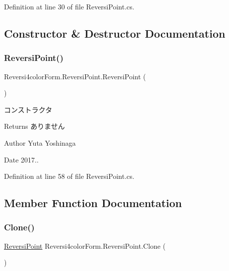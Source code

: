 Definition at line 30 of file Reversi\+Point.\+cs.



\subsection{Constructor \& Destructor Documentation}
\mbox{\label{class_reversi4color_form_1_1_reversi_point_a27174c0214cc9516f398f70a768d00fe}} 
\subsubsection{\texorpdfstring{Reversi\+Point()}{ReversiPoint()}}
{\footnotesize\ttfamily Reversi4color\+Form.\+Reversi\+Point.\+Reversi\+Point (\begin{DoxyParamCaption}{ }\end{DoxyParamCaption})}



コンストラクタ 

\begin{DoxyReturn}{Returns}
ありません 
\end{DoxyReturn}
\begin{DoxyAuthor}{Author}
Yuta Yoshinaga 
\end{DoxyAuthor}
\begin{DoxyDate}{Date}
2017.. 
\end{DoxyDate}


Definition at line 58 of file Reversi\+Point.\+cs.



\subsection{Member Function Documentation}
\mbox{\label{class_reversi4color_form_1_1_reversi_point_a2f9e4db4dd43e27f9c957e5a221ca6f2}} 
\subsubsection{\texorpdfstring{Clone()}{Clone()}}
{\footnotesize\ttfamily \hyperlink{class_reversi4color_form_1_1_reversi_point}{Reversi\+Point} Reversi4color\+Form.\+Reversi\+Point.\+Clone (\begin{DoxyParamCaption}{ }\end{DoxyParamCaption})}



